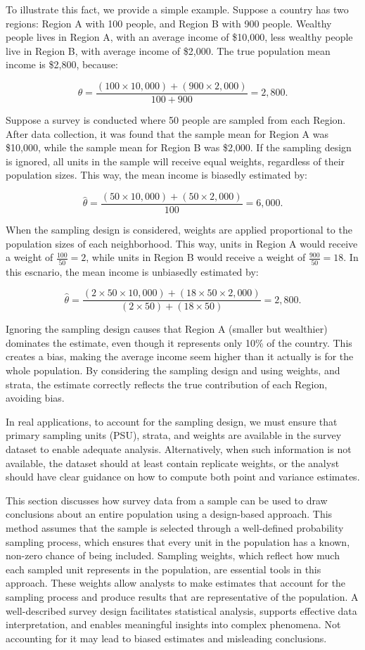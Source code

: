 \documentclass[
  12pt,
]{book}
\begin{document}
To illustrate this fact, we provide a simple example. Suppose a country has two regions: Region A with 100 people, and Region B with 900 people. Wealthy people lives in Region A, with an average income of \$10,000, less wealthy people live in Region B, with average income of \$2,000. The true population mean income is \$2,800, because:

\[
\theta = \frac{(100 \times 10,000) + (900 \times 2,000)}{100 + 900} = 2,800.
\]

Suppose a survey is conducted where 50 people are sampled from each Region. After data collection, it was found that the sample mean for Region A was \$10,000, while the sample mean for Region B was \$2,000. If the sampling design is ignored, all units in the sample will receive equal weights, regardless of their population sizes. This way, the mean income is biasedly estimated by:

\[
\hat \theta = \frac{(50 \times 10,000) + (50 \times 2,000)}{100} = 6,000.
\]

When the sampling design is considered, weights are applied proportional to the population sizes of each neighborhood. This way, units in Region A would receive a weight of \(\frac{100}{50} = 2\), while units in Region B would receive a weight of \(\frac{900}{50} = 18\). In this escnario, the mean income is unbiasedly estimated by:

\[
\hat \theta = \frac{(2 \times 50 \times 10,000) + (18 \times 50 \times 2,000)}{(2 \times 50) + (18 \times 50)} = 2,800.
\]

Ignoring the sampling design causes that Region A (smaller but wealthier) dominates the estimate, even though it represents only 10\% of the country. This creates a bias, making the average income seem higher than it actually is for the whole population. By considering the sampling design and using weights, and strata, the estimate correctly reflects the true contribution of each Region, avoiding bias.

In real applications, to account for the sampling design, we must ensure that primary sampling units (PSU), strata, and weights are available in the survey dataset to enable adequate analysis. Alternatively, when such information is not available, the dataset should at least contain replicate weights, or the analyst should have clear guidance on how to compute both point and variance estimates.

This section discusses how survey data from a sample can be used to draw conclusions about an entire population using a design-based approach. This method assumes that the sample is selected through a well-defined probability sampling process, which ensures that every unit in the population has a known, non-zero chance of being included. Sampling weights, which reflect how much each sampled unit represents in the population, are essential tools in this approach. These weights allow analysts to make estimates that account for the sampling process and produce results that are representative of the population. A well-described survey design facilitates statistical analysis, supports effective data interpretation, and enables meaningful insights into complex phenomena. Not accounting for it may lead to biased estimates and misleading conclusions.
\end{document}
